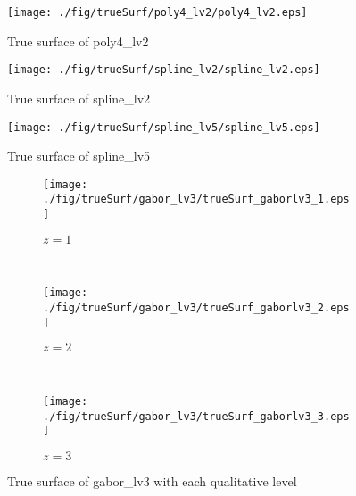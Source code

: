 \begin{figure}[htbp]
  \centering
  \texttt{[image: ./fig/trueSurf/poly4\_lv2/poly4\_lv2.eps]}
  \caption{True surface of poly4\_lv2}\label{fig:trueSurf_poly4_lv2}
\end{figure}

\begin{figure}[htbp]
  \centering
  \texttt{[image: ./fig/trueSurf/spline\_lv2/spline\_lv2.eps]}
  \caption{True surface of spline\_lv2}\label{fig:trueSurf_spline_lv2}
\end{figure}

\begin{figure}[htbp]
  \centering
  \texttt{[image: ./fig/trueSurf/spline\_lv5/spline\_lv5.eps]}
  \caption{True surface of spline\_lv5}\label{fig:trueSurf_spline_lv5}
\end{figure}

\begin{sidewaysfigure}[htbp]
  \centering
  \begin{subfigure}[h]{0.3\textheight}
    \texttt{[image: ./fig/trueSurf/gabor\_lv3/trueSurf\_gaborlv3\_1.eps]}
    \caption{$z = 1$}
  \end{subfigure}
  ~
  \begin{subfigure}[h]{0.3\textheight}
    \texttt{[image: ./fig/trueSurf/gabor\_lv3/trueSurf\_gaborlv3\_2.eps]}
    \caption{$z = 2$}
  \end{subfigure}
  ~
  \begin{subfigure}[h]{0.3\textheight}
    \texttt{[image: ./fig/trueSurf/gabor\_lv3/trueSurf\_gaborlv3\_3.eps]}
    \caption{$z = 3$}
  \end{subfigure}
  \caption{True surface of gabor\_lv3 with each qualitative level}\label{fig:trueSurf_gabor_lv3}
\end{sidewaysfigure}


